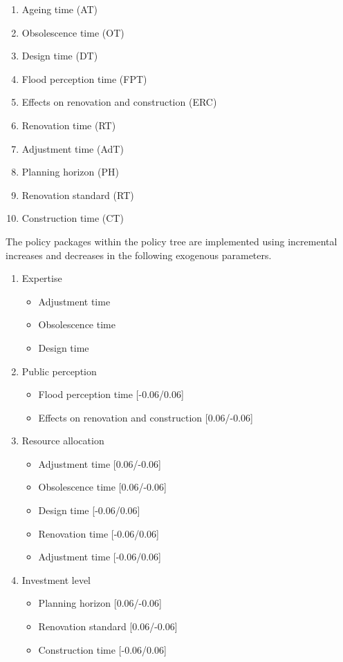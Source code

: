 \documentclass[12pt]{article}
\begin{document}
\begin{enumerate}
\item Ageing time (AT)
\item Obsolescence time (OT)
\item Design time (DT)
\item Flood perception time (FPT)
\item Effects on renovation and construction (ERC)
\item Renovation time (RT)
\item Adjustment time (AdT)
\item Planning horizon (PH)
\item Renovation standard (RT)
\item Construction time (CT)
\end{enumerate}

The policy packages within the policy tree are implemented using incremental increases and decreases in the following exogenous parameters.

\begin{enumerate}
\item Expertise
	\begin{itemize}
	\item Adjustment time
	\item Obsolescence time
	\item Design time
	\end{itemize}
	
\item Public perception
	\begin{itemize}
	\item Flood perception time [-0.06/0.06]
	\item Effects on renovation and construction [0.06/-0.06]
	\end{itemize}
	
\item Resource allocation
	\begin{itemize}
	\item Adjustment time [0.06/-0.06]
	\item Obsolescence time [0.06/-0.06]
	\item Design time [-0.06/0.06]
	\item Renovation time [-0.06/0.06]
	\item Adjustment time [-0.06/0.06]
	\end{itemize}
	
\item Investment level
	\begin{itemize}
	\item Planning horizon [0.06/-0.06]
	\item Renovation standard [0.06/-0.06]
	\item Construction time [-0.06/0.06]
	\end{itemize}

\end{enumerate}
\end{document}
